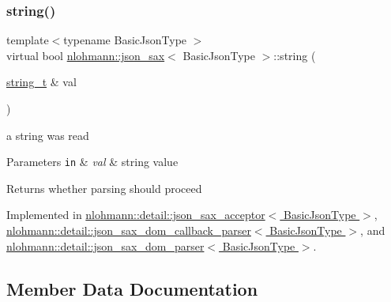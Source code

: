 \mbox{\label{structnlohmann_1_1json__sax_a07eab82f6c82d606787eee9ad73d2bda}} 
\subsubsection{\texorpdfstring{string()}{string()}}
{\footnotesize\ttfamily template$<$typename Basic\+Json\+Type $>$ \\
virtual bool \hyperlink{structnlohmann_1_1json__sax}{nlohmann\+::json\+\_\+sax}$<$ Basic\+Json\+Type $>$\+::string (\begin{DoxyParamCaption}\item[{\hyperlink{structnlohmann_1_1json__sax_ae01977a9f3c5b3667b7a2929ed91061e}{string\+\_\+t} \&}]{val }\end{DoxyParamCaption})\hspace{0.3cm}{\ttfamily [pure virtual]}}



a string was read 


\begin{DoxyParams}[1]{Parameters}
\mbox{\tt in}  & {\em val} & string value \\
\hline
\end{DoxyParams}
\begin{DoxyReturn}{Returns}
whether parsing should proceed 
\end{DoxyReturn}


Implemented in \hyperlink{classnlohmann_1_1detail_1_1json__sax__acceptor_a72e61155545d43bb829c9a9211978300}{nlohmann\+::detail\+::json\+\_\+sax\+\_\+acceptor$<$ Basic\+Json\+Type $>$}, \hyperlink{classnlohmann_1_1detail_1_1json__sax__dom__callback__parser_aadc7fe390bdd8fb721b6789bd80a5903}{nlohmann\+::detail\+::json\+\_\+sax\+\_\+dom\+\_\+callback\+\_\+parser$<$ Basic\+Json\+Type $>$}, and \hyperlink{classnlohmann_1_1detail_1_1json__sax__dom__parser_a1c0e1e24fb803e358f63fcb5c1d1e4ee}{nlohmann\+::detail\+::json\+\_\+sax\+\_\+dom\+\_\+parser$<$ Basic\+Json\+Type $>$}.



\subsection{Member Data Documentation}
\mbox{\label{structnlohmann_1_1json__sax_a84031c6bbd5b85ec13da024fe9e2b9c9}} 
